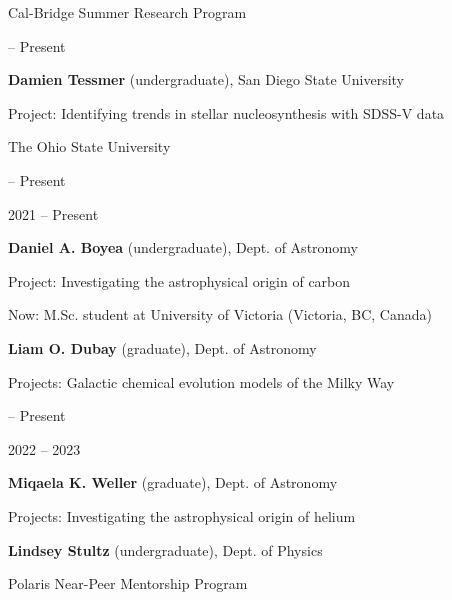\documentclass[cv.tex]{subfiles}
\begin{document}
{\color{themecolor} \large Cal-Bridge Summer Research Program}
\par\noindent
\parbox{0.18\textwidth}{%
	 -- Present \par
	\null \par
}
\hspace{1mm}
\parbox{0.8\textwidth}{%
	\vspace{1mm}
	\textbf{Damien Tessmer} (undergraduate), San Diego State University \par
	Project: Identifying trends in stellar nucleosynthesis with SDSS-V data \par
}

\vspace{5mm}
\noindent
{\color{themecolor} \large The Ohio State University}
\par\noindent
\parbox{0.18\textwidth}{%
	 -- Present \par
	\null \par
	\null \par
	2021 -- Present \par
	\null \par
}
\hspace{1mm}
\parbox{0.8\textwidth}{%
	\vspace{1mm}
	\textbf{Daniel A. Boyea} (undergraduate), Dept. of Astronomy \par
	Project: Investigating the astrophysical origin of carbon \par
	Now: M.Sc. student at University of Victoria (Victoria, BC, Canada) \par
	\textbf{Liam O. Dubay} (graduate), Dept. of Astronomy \par
	Projects: Galactic chemical evolution models of the Milky Way \par
}

\newpage
\noindent
\parbox{0.18\textwidth}{%
	 -- Present \par
	\null \par
	2022 -- 2023 \par
	\null
}
\hspace{1mm}
\parbox{0.8\textwidth}{%
	\vspace{1mm}
	\textbf{Miqaela K. Weller} (graduate), Dept. of Astronomy \par
	Projects: Investigating the astrophysical origin of helium \par
	\textbf{Lindsey Stultz} (undergraduate), Dept. of Physics \par
	Polaris Near-Peer Mentorship Program
}
\end{document}
